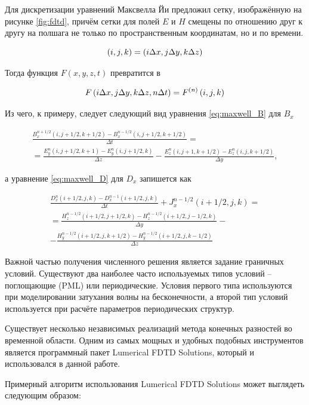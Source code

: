 Для дискретизации уравнений Максвелла Йи предложил сетку, изображённую на рисунке \ref{fig:fdtd}, причём сетки для полей $E$ и $H$ смещены по отношению друг к другу на полшага не только по пространственным координатам, но и по времени.

\begin{equation}
  \left( i, j, k \right) = \left( i\Delta x, j\Delta y, k\Delta z \right)
\end{equation}

Тогда функция $F(x, y, z, t)$ превратится в

\begin{equation}
  F\left( i\Delta x, j\Delta y, k\Delta z, n\Delta t \right) = F^{(n)}\left( i,j,k \right) 
\end{equation}

Из чего, к примеру, следует следующий вид уравнения \ref{eq:maxwell_B} для $B_x$

\begin{multline}
	\frac{B_x^{n+1/2}(i,j+1/2,k+1/2)-B_x^{n-1/2}(i,j+1/2,k+1/2)}{\Delta t} = \\
	= \frac{E_y^n(i, j+1/2,k+1) - E_y^n(i, j+1/2,k)}{\Delta z} - \frac{E_z^n(i, j+1,k+1/2) - E_z^n(i,j,k+1/2)}{\Delta y},
\end{multline}

а уравнение \ref{eq:maxwell_D} для $D_x$ запишется как

\begin{multline}
	\frac{D_x^n(i+1/2,j,k) - D_x^{n-1}(i+1/2,j,k)}{\Delta t} + J_x^{n-1/2}(i+1/2,j,k)= \\
	= \frac{H_z^{n-1/2}(i+1/2,j+1/2,k) - H_z^{n-1/2}(i+1/2,j-1/2,k)}{\Delta y} - \\
	- \frac{H_y^{n-1/2}(i+1/2,j,k+1/2) - H_y^{n-1/2}(i+1/2,j,k-1/2)}{\Delta z}
\end{multline}

Важной частью получения численного решения является задание граничных условий. Существуют два наиболее часто используемых типов условий -- поглощающие (PML) или периодические. Условия первого типа используются при моделировании затухания волны на бесконечности, а второй тип условий используется при расчёте параметров периодических структур.

Существует несколько независимых реализаций метода конечных разностей во временной области. Одним из самых мощных и удобных подобных инструментов является программный пакет Lumerical FDTD Solutions, который и использовался в данной работе.

Примерный алгоритм использования Lumerical FDTD Solutions может выглядеть следующим образом:

